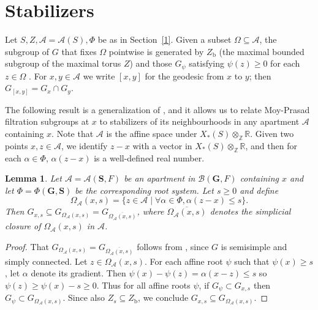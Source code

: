 \documentclass[12pt]{amsart}
\newcommand{\Zb}{Z_{\mathrm{b}}}
\newcommand{\ratk}{F}
\newcommand{\GG}{\mathbf{G}} %
\newcommand{\Stor}{\mathbf{S}} %
\newcommand{\apart}{{\mathcal{A}}}
\newcommand{\Aset}{\Omega_{\apart}}
\newcommand{\buil}{\mathcal{B}}
\theoremstyle{plain}
\newtheorem{lemma}[theorem]{Lemma}
\theoremstyle{definition}
\theoremstyle{remark}
\numberwithin{equation}{section}
\numberwithin{figure}{section}
\begin{document}
\section{Stabilizers}\label{4}

 Let $S,Z,\apart=\apart(S), \Phi$ be as in Section~\ref{1}.  Given a subset $\Omega \subseteq \apart$, the subgroup of $G$ that fixes $\Omega$ pointwise is generated by $\Zb$ (the maximal bounded subgroup of the maximal torus $Z$) and those $G_\psi$ satisfying $\psi(z) \geq 0$ for each $z\in \Omega$ \cite[\S 6.4]{BruhatTits1972}.  For $x,y\in \apart$ we write $[x,y]$ for the geodesic from $x$ to $y$; then $G_{[x,y]} = G_x\cap G_y$.  



The following result is a generalization of \cite[Prop 3.3]{Nevins2014}, and it allows us to relate Moy-Prasad filtration subgroups at $x$ to stabilizers of  its neighbourhoods in any apartment $\apart$ containing $x$.  Note that $\apart$ is the affine space under $X_*(S)\otimes_{\mathbb{Z}}\mathbb{R}$.  Given two points $x,z\in \apart$, we identify $z-x$ with a vector in $X_*(S)\otimes_{\mathbb{Z}}\mathbb{R}$, and then for each $\alpha \in \Phi$, $\alpha(z-x)$ is a well-defined real number.

\begin{lemma}\label{L:stabilizers}
Let $\apart=\apart(\Stor,\ratk)$ be an apartment in $\buil(\GG,\ratk)$ containing $x$ and let $\Phi=\Phi(\GG,\Stor)$ be the corresponding root system.  Let $s \geq 0$ and define 
$$
\Aset(x,s)=\{ z \in \apart \mid \forall \alpha \in \Phi, \alpha(z-x) \leq s\}.
$$
Then $G_{x,s} \subseteq G_{\Aset(x,s)} = G_{\overline{\Aset(x,s)}}$, where 
$\overline{\Aset(x,s)}$ denotes the simplicial closure of $\Aset(x,s)$ in $\apart$.
\end{lemma}

\begin{proof}
That $G_{\Aset(x,s)} = G_{\overline{\Aset(x,s)}}$ follows from \cite[2.4.13]{BruhatTits1972}, since $G$ is semisimple and simply connected.   
Let $z\in \Aset(x,s)$.  For each affine root $\psi$ such that $\psi(x)\geq s$, let $\alpha$ denote its gradient.  Then $\psi(x)-\psi(z) = \alpha(x-z) \leq s$ so $\psi(z) \geq \psi(x)-s \geq 0$.  Thus for all affine roots $\psi$, if $G_\psi \subset G_{x,s}$ then $G_\psi \subset G_{\Aset(x,s)}$.  Since also $Z_s \subseteq \Zb$, we conclude $G_{x,s}\subseteq  G_{\Aset(x,s)}$.  
\end{proof}
\end{document}
